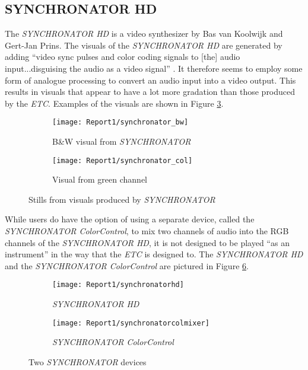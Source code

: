 \documentclass[../../main_report1.tex]{subfiles}
\begin{document}
\subsection{SYNCHRONATOR HD}
The \textit{SYNCHRONATOR HD} is a video synthesizer by Bas van Koolwijk and Gert-Jan Prins. The visuals of the \textit{SYNCHRONATOR HD} are generated by adding ``video sync pulses and color coding signals to [the] audio input...disguising the audio as a video signal'' \cite{VanKoolwijk}. It therefore seems to employ some form of analogue processing to convert an audio input into a video output. This results in visuals that appear to have a lot more gradation than those produced by the \textit{ETC}. Examples of the visuals are shown in Figure \ref{fig:synchronatorstills}. \par

\begin{figure}
  \begin{subfigure}{0.5\textwidth}
    \texttt{[image: Report1/synchronator\_bw]}
    \caption{B\&W visual from \textit{SYNCHRONATOR} \cite{VanKoolwijka}}
    \label{fig:synchronatorstillbw}
  \end{subfigure}
  \begin{subfigure}{0.5\textwidth}
    \texttt{[image: Report1/synchronator\_col]}
    \caption{Visual from green channel \cite{VanKoolwijka}}
    \label{fig:synchronatorstillcol}
  \end{subfigure}
  \caption{Stills from visuals produced by \textit{SYNCHRONATOR}}
  \label{fig:synchronatorstills}
\end{figure}

While users do have the option of using a separate device, called the \textit{SYNCHRONATOR ColorControl}, to mix two channels of audio into the RGB channels of the \textit{SYNCHRONATOR HD}, it is not designed to be played ``as an instrument'' in the way that the \textit{ETC} is designed to. The \textit{SYNCHRONATOR HD} and the \textit{SYNCHRONATOR ColorControl} are pictured in Figure \ref{fig:synchronatordevices}. \par
\begin{figure}
  \begin{subfigure}{0.5\textwidth}
    \texttt{[image: Report1/synchronatorhd]}
    \caption{\textit{SYNCHRONATOR HD} \cite{VanKoolwijk}}
    \label{fig:synchronatorhd}
  \end{subfigure}
  \begin{subfigure}{0.5\textwidth}
    \texttt{[image: Report1/synchronatorcolmixer]}
    \caption{\textit{SYNCHRONATOR ColorControl} \cite{VanKoolwijk}}
    \label{fig:synchronatorcol}
  \end{subfigure}
  \caption{Two \textit{SYNCHRONATOR} devices}
  \label{fig:synchronatordevices}
\end{figure}
\end{document}
